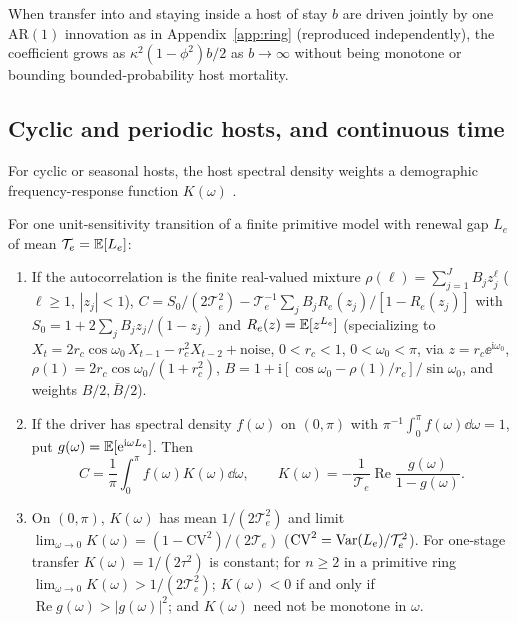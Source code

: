 \begin{remark}\label{rem:ring-joint-stay}
When transfer into and staying inside a host of stay $b$ are driven jointly by one $\mathrm{AR}(1)$ innovation as in Appendix~\ref{app:ring} (reproduced independently), the coefficient grows as $\kappa^2(1 - \phi^2)b/2$ as $b \to \infty$ without being monotone or bounding bounded-probability host mortality.
\end{remark}

\subsection{Cyclic and periodic hosts, and continuous time}\label{subsec:ring-cyclic}

For cyclic or seasonal hosts, the host spectral density weights a demographic frequency-response function $K(\omega)$ \citep{tuljapurkar1985,bacaer2007}.

\begin{proposition}\label{prop:ring-spectrum}
For one unit-sensitivity transition of a finite primitive model with renewal gap $L_e$ of mean $\mathcal{T}_e = \mathbb{E}[L_e]$:
\begin{enumerate}
\item[(a)] If the autocorrelation is the finite real-valued mixture $\rho(\ell) = \sum_{j=1}^{J} B_j z_j^\ell$ ($\ell \ge 1$, $|z_j| < 1$), $C = S_0/(2\mathcal{T}_e^2) - \mathcal{T}_e^{-1}\sum_j B_j R_e(z_j)/[1 - R_e(z_j)]$ with $S_0 = 1 + 2\sum_j B_j z_j/(1 - z_j)$ and $R_e(z) = \mathbb{E}[z^{L_e}]$ (specializing to $X_t = 2r_c\cos\omega_0\,X_{t-1} - r_c^2 X_{t-2} + \text{noise}$, $0 < r_c < 1$, $0 < \omega_0 < \pi$, via $z = r_c\ee^{\mathrm{i}\omega_0}$, $\rho(1) = 2r_c\cos\omega_0/(1 + r_c^2)$, $B = 1 + \mathrm{i}[\cos\omega_0 - \rho(1)/r_c]/\sin\omega_0$, and weights $B/2, \bar{B}/2$).
\item[(b)] If the driver has spectral density $f(\omega)$ on $(0,\pi)$ with $\pi^{-1}\int_0^\pi f(\omega)\dd\omega = 1$, put $g(\omega) = \mathbb{E}[\mathrm{e}^{\mathrm{i}\omega L_e}]$. Then
\begin{equation}
C = \frac{1}{\pi}\int_0^\pi f(\omega) K(\omega)\dd\omega, \qquad K(\omega) = -\frac{1}{\mathcal{T}_e}\operatorname{Re}\frac{g(\omega)}{1 - g(\omega)}.
\label{eq:ring-spectrum}
\end{equation}
\item[(c)] On $(0,\pi)$, $K(\omega)$ has mean $1/(2\mathcal{T}_e^2)$ and limit $\lim_{\omega \to 0} K(\omega) = (1 - \mathrm{CV}^2)/(2\mathcal{T}_e)$ ($\mathrm{CV}^2 = \operatorname{Var}(L_e)/\mathcal{T}_e^2$). For one-stage transfer $K(\omega) = 1/(2\tau^2)$ is constant; for $n \ge 2$ in a primitive ring $\lim_{\omega \to 0} K(\omega) > 1/(2\mathcal{T}_e^2)$; $K(\omega) < 0$ if and only if $\operatorname{Re} g(\omega) > |g(\omega)|^2$; and $K(\omega)$ need not be monotone in $\omega$.
\end{enumerate}
\end{proposition}

